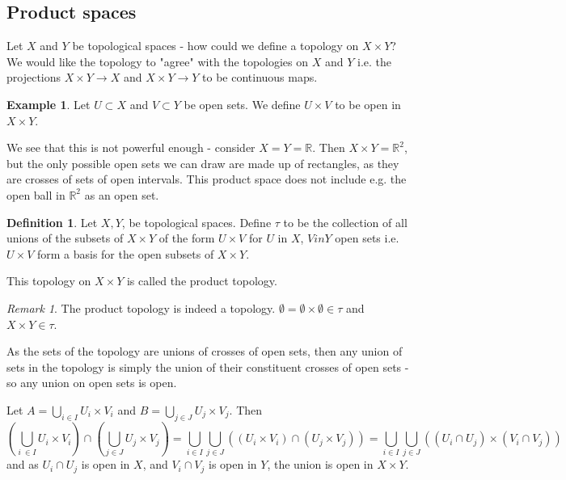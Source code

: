 \documentclass{article}
\theoremstyle{definition}
\newtheorem{defn}{Definition}[section]
\newtheorem{exmp}{Example}[section]
\theoremstyle{plain}%
\theoremstyle{remark}
\newtheorem*{rem}{Remark}
\newcommand{\Union}{\bigcup}
\newcommand{\intersection}{\cap}
\newcommand{\cross}{\times}
\newcommand{\R}{\mathbb{R}}
\begin{document}
\subsection{Product spaces}

Let $X$ and $Y$ be topological spaces - how could we define a topology on $X \cross Y$? We would like the topology to "agree" with the topologies on $X$ and $Y$ i.e. the projections $X \cross Y \to X$ and $X \cross Y \to Y$ to be continuous maps.

\begin{exmp}
    Let $U \subset X$ and $V \subset Y$ be open sets. We define $U \cross V$ to be open in $X \cross Y$.

    We see that this is not powerful enough - consider $X = Y = \R$. Then $X \cross Y = \R^2$, but the only possible open sets we can draw are made up of rectangles, as they are crosses of sets of open intervals. This product space does not include e.g. the open ball in $\R^2$ as an open set.
\end{exmp}

\begin{defn}
    Let $X, Y$, be topological spaces. Define $\tau$ to be the collection of all unions of the subsets of $X \cross Y$ of the form $U \cross V$ for $U$ in $X$, $V in Y$ open sets i.e. $U \times V$ form a basis for the open subsets of $X \times Y$.

    This topology on $X \cross Y$ is called the product topology.
\end{defn}

\begin{rem}
    The product topology is indeed a topology. $\emptyset = \emptyset \cross \emptyset \in \tau$ and $X \cross Y \in \tau$.

    As the sets of the topology are unions of crosses of open sets, then any union of sets in the topology is simply the union of their constituent crosses of open sets - so any union on open sets is open.

    Let $A = \Union_{i \in I} U_i \cross V_i$ and $B = \Union_{j \in J} U_j \cross V_j$. Then
    \[\left(\Union_{i\ \in I} U_i \cross V_i\right) \intersection \left( \Union_{j \in J} U_j \cross V_j \right) = \Union_{i \in I} \Union_{j \in J} \left( (U_i \cross V_i) \intersection (U_j \cross V_j) \right) = \Union_{i \in I}\Union_{j \in J} \left( (U_i \intersection U_j) \cross (V_i \intersection V_j) \right) \]
    and as $U_i \intersection U_j$ is open in $X$, and $V_i \intersection V_j$ is open in $Y$, the union is open in $X \cross Y$.
\end{rem}
\end{document}
